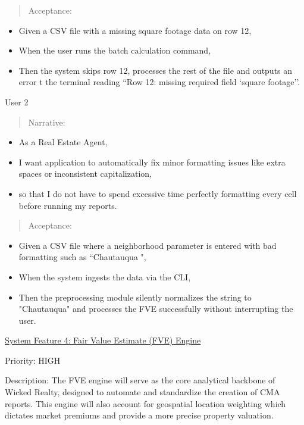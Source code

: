 \documentclass[
]{article}
\begin{document}
\begin{quote}
Acceptance:
\end{quote}

\begin{itemize}
\item
  Given a CSV file with a missing square footage data on row 12,
\item
  When the user runs the batch calculation command,
\item
  Then the system skips row 12, processes the rest of the file and
  outputs an error t the terminal reading ``Row 12: missing required
  field `square footage''.
\end{itemize}

User 2

\begin{quote}
Narrative:
\end{quote}

\begin{itemize}
\item
  As a Real Estate Agent,
\item
  I want application to automatically fix minor formatting issues like
  extra spaces or inconsistent capitalization,
\item
  so that I do not have to spend excessive time perfectly formatting
  every cell before running my reports.
\end{itemize}

\begin{quote}
Acceptance:
\end{quote}

\begin{itemize}
\item
  Given a CSV file where a neighborhood parameter is entered with bad
  formatting such as ``Chautauqua ",
\item
  When the system ingests the data via the CLI,
\item
  Then the preprocessing module silently normalizes the string to
  "Chautauqua" and processes the FVE successfully without interrupting
  the user.
\end{itemize}

\ul{System Feature 4: Fair Value Estimate (FVE) Engine}

Priority: HIGH

Description: The FVE engine will serve as the core analytical backbone
of Wicked Realty, designed to automate and standardize the creation of
CMA reports. This engine will also account for geospatial location
weighting which dictates market premiums and provide a more precise
property valuation.
\end{document}
